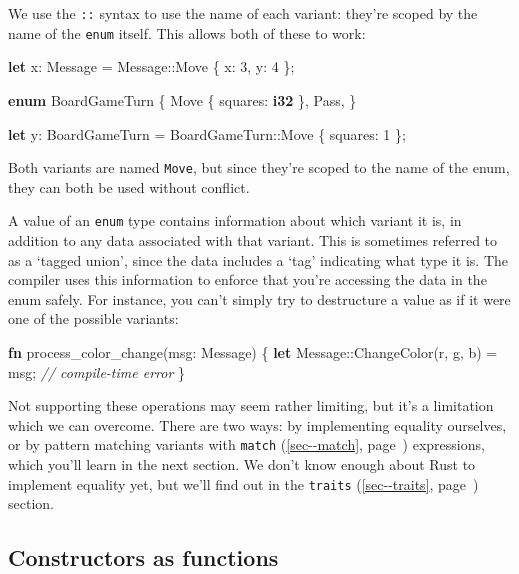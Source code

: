 \documentclass[a4paper,]{book}
\renewcommand*{\hyperref}[2][\ar]{%
  \def\ar{#2}%
  #2 (\autoref{#1}, page~\pageref{#1})}
\newenvironment{Shaded}{\begin{snugshade}}{\end{snugshade}}
\newcommand{\KeywordTok}[1]{\textcolor[rgb]{0.13,0.29,0.53}{\textbf{{#1}}}}
\newcommand{\DecValTok}[1]{\textcolor[rgb]{0.00,0.00,0.81}{{#1}}}
\newcommand{\CommentTok}[1]{\textcolor[rgb]{0.56,0.35,0.01}{\textit{{#1}}}}
\newcommand{\NormalTok}[1]{{#1}}
\begin{document}
We use the \texttt{::} syntax to use the name of each variant: they're
scoped by the name of the \texttt{enum} itself. This allows both of
these to work:

\begin{Shaded}
\begin{Highlighting}[]
\KeywordTok{let} \NormalTok{x: Message = Message::Move \{ x: }\DecValTok{3}\NormalTok{, y: }\DecValTok{4} \NormalTok{\};}

\KeywordTok{enum} \NormalTok{BoardGameTurn \{}
    \NormalTok{Move \{ squares: }\KeywordTok{i32} \NormalTok{\},}
    \NormalTok{Pass,}
\NormalTok{\}}

\KeywordTok{let} \NormalTok{y: BoardGameTurn = BoardGameTurn::Move \{ squares: }\DecValTok{1} \NormalTok{\};}
\end{Highlighting}
\end{Shaded}

Both variants are named \texttt{Move}, but since they're scoped to the
name of the enum, they can both be used without conflict.

A value of an \texttt{enum} type contains information about which
variant it is, in addition to any data associated with that variant.
This is sometimes referred to as a `tagged union', since the data
includes a `tag' indicating what type it is. The compiler uses this
information to enforce that you're accessing the data in the enum
safely. For instance, you can't simply try to destructure a value as if
it were one of the possible variants:

\begin{Shaded}
\begin{Highlighting}[]
\KeywordTok{fn} \NormalTok{process_color_change(msg: Message) \{}
    \KeywordTok{let} \NormalTok{Message::ChangeColor(r, g, b) = msg; }\CommentTok{// compile-time error}
\NormalTok{\}}
\end{Highlighting}
\end{Shaded}

Not supporting these operations may seem rather limiting, but it's a
limitation which we can overcome. There are two ways: by implementing
equality ourselves, or by pattern matching variants with
\hyperref[sec--match]{\texttt{match}} expressions, which you'll learn in
the next section. We don't know enough about Rust to implement equality
yet, but we'll find out in the \hyperref[sec--traits]{\texttt{traits}}
section.

\subsection{Constructors as functions}\label{constructors-as-functions}
\end{document}

